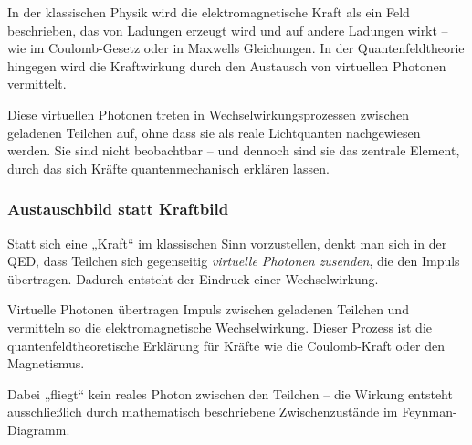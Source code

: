 In der klassischen Physik wird die elektromagnetische Kraft als ein Feld beschrieben, das von Ladungen erzeugt wird und auf andere Ladungen wirkt – wie im Coulomb-Gesetz oder in Maxwells Gleichungen. In der Quantenfeldtheorie hingegen wird die Kraftwirkung durch den Austausch von virtuellen Photonen vermittelt.

Diese virtuellen Photonen treten in Wechselwirkungsprozessen zwischen geladenen Teilchen auf, ohne dass sie als reale Lichtquanten nachgewiesen werden. Sie sind nicht beobachtbar – und dennoch sind sie das zentrale Element, durch das sich Kräfte quantenmechanisch erklären lassen.

\subsubsection*{Austauschbild statt Kraftbild}

Statt sich eine „Kraft“ im klassischen Sinn vorzustellen, denkt man sich in der QED, dass Teilchen sich gegenseitig \emph{virtuelle Photonen zusenden}, die den Impuls übertragen. Dadurch entsteht der Eindruck einer Wechselwirkung. 
\medskip
\begin{tcolorbox}[physikbox, title=Virtuelle Photonen als Kraftvermittler]
	\label{box:Virtuelle Photonen als kraftvermittler}
	Virtuelle Photonen übertragen Impuls zwischen geladenen Teilchen und vermitteln so die elektromagnetische Wechselwirkung. Dieser Prozess ist die quantenfeldtheoretische Erklärung für Kräfte wie die Coulomb-Kraft oder den Magnetismus.
	
	Dabei „fliegt“ kein reales Photon zwischen den Teilchen – die Wirkung entsteht ausschließlich durch mathematisch beschriebene Zwischenzustände im Feynman-Diagramm.
\end{tcolorbox}

